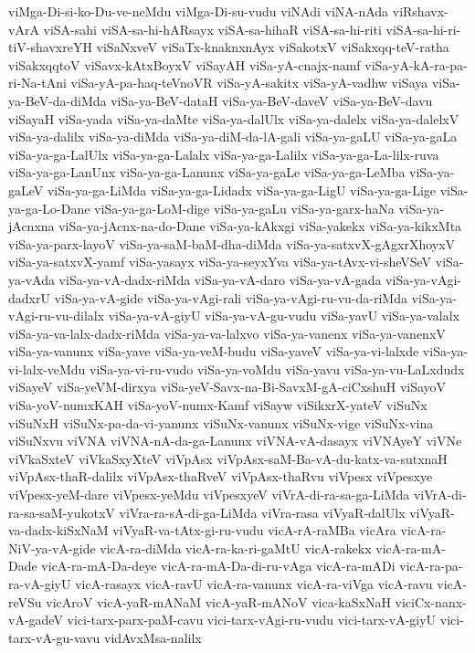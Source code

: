 {viMga-Di-si-ko-Du-ve-neMdu
viMga-Di-su-vudu
viNAdi
viNA-nAda
viRshavx-vArA
viSA-sahi
viSA-sa-hi-hARsayx
viSA-sa-hihaR
viSA-sa-hi-riti
viSA-sa-hi-ri-tiV-shavxreYH
viSaNxveV
viSaTx-knaknxnAyx
viSakotxV
viSakxqq-teV-ratha
viSakxqqtoV
viSavx-kAtxBoyxV
viSayAH
viSa-yA-cnajx-namf
viSa-yA-kA-ra-pa-ri-Na-tAni
viSa-yA-pa-haq-teVnoVR
viSa-yA-sakitx
viSa-yA-vadhw
viSaya
viSa-ya-BeV-da-diMda
viSa-ya-BeV-dataH
viSa-ya-BeV-daveV
viSa-ya-BeV-davu
viSayaH
viSa-yada
viSa-ya-daMte
viSa-ya-dalUlx
viSa-ya-dalelx
viSa-ya-dalelxV
viSa-ya-dalilx
viSa-ya-diMda
viSa-ya-diM-da-lA-gali
viSa-ya-gaLU
viSa-ya-gaLa
viSa-ya-ga-LalUlx
viSa-ya-ga-Lalalx
viSa-ya-ga-Lalilx
viSa-ya-ga-La-lilx-ruva
viSa-ya-ga-LanUnx
viSa-ya-ga-Lanunx
viSa-ya-gaLe
viSa-ya-ga-LeMba
viSa-ya-gaLeV
viSa-ya-ga-LiMda
viSa-ya-ga-Lidadx
viSa-ya-ga-LigU
viSa-ya-ga-Lige
viSa-ya-ga-Lo-Dane
viSa-ya-ga-LoM-dige
viSa-ya-gaLu
viSa-ya-garx-haNa
viSa-ya-jAcnxna
viSa-ya-jAcnx-na-do-Dane
viSa-ya-kAkxgi
viSa-yakekx
viSa-ya-kikxMta
viSa-ya-parx-layoV
viSa-ya-saM-baM-dha-diMda
viSa-ya-satxvX-gAgxrXhoyxV
viSa-ya-satxvX-yamf
viSa-yasayx
viSa-ya-seyxYva
viSa-ya-tAvx-vi-sheVSeV
viSa-ya-vAda
viSa-ya-vA-dadx-riMda
viSa-ya-vA-daro
viSa-ya-vA-gada
viSa-ya-vAgi-dadxrU
viSa-ya-vA-gide
viSa-ya-vAgi-rali
viSa-ya-vAgi-ru-vu-da-riMda
viSa-ya-vAgi-ru-vu-dilalx
viSa-ya-vA-giyU
viSa-ya-vA-gu-vudu
viSa-yavU
viSa-ya-valalx
viSa-ya-va-lalx-dadx-riMda
viSa-ya-va-lalxvo
viSa-ya-vanenx
viSa-ya-vanenxV
viSa-ya-vanunx
viSa-yave
viSa-ya-veM-budu
viSa-yaveV
viSa-ya-vi-lalxde
viSa-ya-vi-lalx-veMdu
viSa-ya-vi-ru-vudo
viSa-ya-voMdu
viSa-yavu
viSa-ya-vu-LaLxdudx
viSayeV
viSa-yeVM-dirxya
viSa-yeV-Savx-na-Bi-SavxM-gA-ciCxshuH
viSayoV
viSa-yoV-numxKAH
viSa-yoV-numx-Kamf
viSayw
viSikxrX-yateV
viSuNx
viSuNxH
viSuNx-pa-da-vi-yanunx
viSuNx-vanunx
viSuNx-vige
viSuNx-vina
viSuNxvu
viVNA
viVNA-nA-da-ga-Lanunx
viVNA-vA-dasayx
viVNAyeY
viVNe
viVkaSxteV
viVkaSxyXteV
viVpAsx
viVpAsx-saM-Ba-vA-du-katx-va-sutxnaH
viVpAsx-thaR-dalilx
viVpAsx-thaRveV
viVpAsx-thaRvu
viVpesx
viVpesxye
viVpesx-yeM-dare
viVpesx-yeMdu
viVpesxyeV
viVrA-di-ra-sa-ga-LiMda
viVrA-di-ra-sa-saM-yukotxV
viVra-ra-sA-di-ga-LiMda
viVra-rasa
viVyaR-dalUlx
viVyaR-va-dadx-kiSxNaM
viVyaR-va-tAtx-gi-ru-vudu
vicA-rA-raMBa
vicAra
vicA-ra-NiV-ya-vA-gide
vicA-ra-diMda
vicA-ra-ka-ri-gaMtU
vicA-rakekx
vicA-ra-mA-Dade
vicA-ra-mA-Da-deye
vicA-ra-mA-Da-di-ru-vAga
vicA-ra-mADi
vicA-ra-pa-ra-vA-giyU
vicA-rasayx
vicA-ravU
vicA-ra-vanunx
vicA-ra-viVga
vicA-ravu
vicA-reVSu
vicAroV
vicA-yaR-mANaM
vicA-yaR-mANoV
vica-kaSxNaH
viciCx-nanx-vA-gadeV
vici-tarx-parx-paM-cavu
vici-tarx-vAgi-ru-vudu
vici-tarx-vA-giyU
vici-tarx-vA-gu-vavu
vidAvxMsa-nalilx
}
